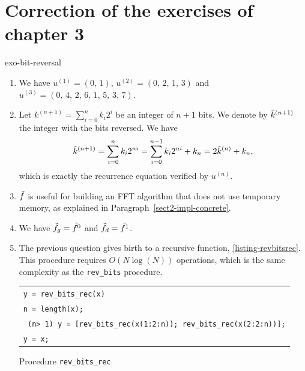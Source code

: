 \section{Correction of the exercises of chapter 3}
 
 
\begin{correction}{exo-bit-reversal}
\begin{enumerate}
\item We have $ u^{(1)} = (0, \, 1) $, $ u^{(2)} = (0, \, 2, \, 1, \, 3) $ and $ u^{(3)} = (0, \, 4, \, 2, \, 6, \, 1, \, 5, \, 3, \, 7) $.
\item Let $ k^{(n+1)} = \sum_{i = 0}^n{k_i 2^i} $ be an integer of $ n+1 $ bits. We denote by $ \tilde{k}^{(n+1)} $ the integer with the bits reversed. We have
\begin{equation*}
\tilde{k}^{(n+1)} = \sum_{i = 0}^{n}{k_{i} 2^{ni}} = \sum_{i = 0}^{n-1}{k_{i} 2^{ni}} + k_n = 2 \tilde{k}^{(n)} + k_n,
\end{equation*}
which is exactly the recurrence equation verified by $ u^{(n)} $.
\item $ \tilde{f} $ is useful for building an FFT algorithm that does not use temporary memory, as explained in Paragraph~\ref{sect2-impl-concrete}.
\item We have $ \tilde{f}_g = \tilde{f^0} $ and $ \tilde{f}_d = \tilde{f^1} $.
\item The previous question gives birth to a recursive \Matlab{} function, \listingterme{} \ref{listing-revbitsrec}. This procedure requires $ O(N \log (N)) $ operations, which is the same complexity as the \texttt{\upshape rev\_bits} procedure.

\begin{listing} 
\begin{footnotesize} 
{\upshape
\begin{tabular}{l} \texttt{\pfunction y = rev\_bits\_rec(x)} \\
\texttt{n = length(x);} \\
\texttt{\pif{} (n> 1) y = [rev\_bits\_rec(x(1:2:n)); rev\_bits\_rec(x(2:2:n))];} \\
\texttt{\pelse y = x; \pend} \\
\end{tabular}
}
\end{footnotesize}
\caption{Procedure \texttt{\upshape rev\_bits\_rec}}
\label{listing-revbitsrec}
\end{listing}
\end{enumerate}
\end{correction}
 
